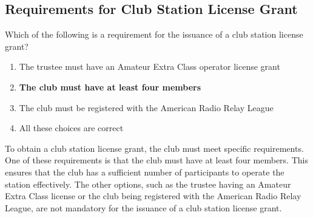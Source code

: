 \subsection{Requirements for Club Station License Grant}
\label{T1F11}

\begin{tcolorbox}[colback=gray!10!white,colframe=black!75!black,title=T1F11]
Which of the following is a requirement for the issuance of a club station license grant?
\begin{enumerate}[label=\Alph*),noitemsep]
    \item The trustee must have an Amateur Extra Class operator license grant
    \item \textbf{The club must have at least four members}
    \item The club must be registered with the American Radio Relay League
    \item All these choices are correct
\end{enumerate}
\end{tcolorbox}

To obtain a club station license grant, the club must meet specific requirements. One of these requirements is that the club must have at least four members. This ensures that the club has a sufficient number of participants to operate the station effectively. The other options, such as the trustee having an Amateur Extra Class license or the club being registered with the American Radio Relay League, are not mandatory for the issuance of a club station license grant.